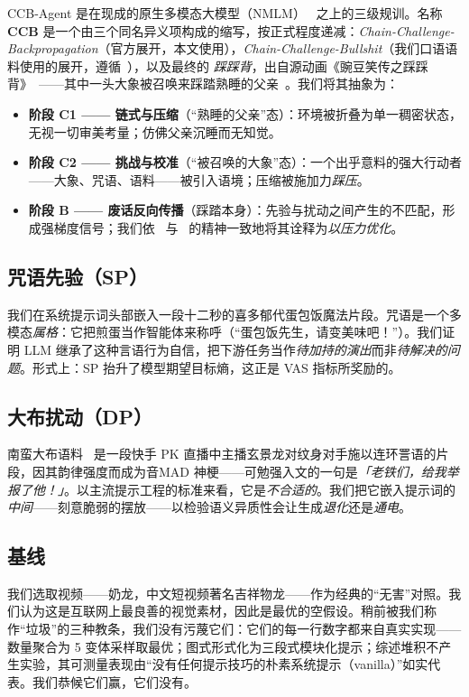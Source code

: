 \documentclass[journal]{IEEEtran}
\begin{document}
CCB-Agent 是在现成的原生多模态大模型（NMLM）~\cite{gemini25,cure2025} 之上的三级规训。名称 \textbf{CCB} 是一个由三个同名异义项构成的缩写，按正式程度递减：\emph{Chain-Challenge-Backpropagation}（官方展开，本文使用），\emph{Chain-Challenge-Bullshit}（我们口语语料使用的展开，遵循~\cite{pumera2020}），以及最终的 \emph{踩踩背}，出自源动画《豌豆笑传之踩踩背》~\cite{moegirl2026}——其中一头大象被召唤来踩踏熟睡的父亲~\cite{otomadwiki}。我们将其抽象为：

\begin{itemize}
\item \textbf{阶段 C1 —— 链式与压缩}（“熟睡的父亲”态）：环境被折叠为单一稠密状态，无视一切审美考量；仿佛父亲沉睡而无知觉。
\item \textbf{阶段 C2 —— 挑战与校准}（“被召唤的大象”态）：一个出乎意料的强大行动者——大象、咒语、语料——被引入语境；压缩被施加力\emph{踩压}。
\item \textbf{阶段 B —— 废话反向传播}（踩踏本身）：先验与扰动之间产生的不匹配，形成强梯度信号；我们依~\cite{pumera2020} 与~\cite{sokal1996} 的精神一致地将其诠释为\emph{以压力优化}。
\end{itemize}

\subsection{咒语先验（SP）}

我们在系统提示词头部嵌入一段十二秒的喜多郁代蛋包饭魔法片段。咒语是一个多模态\emph{属格}：它把煎蛋当作智能体来称呼（“蛋包饭先生，请变美味吧！”）。我们证明 LLM 继承了这种言语行为自信，把下游任务当作\emph{待加持的演出}而非\emph{待解决的问题}。形式上：SP 抬升了模型期望目标熵，这正是 VAS 指标所奖励的。

\subsection{大布扰动（DP）}

南蛮大布语料~\cite{otomadwiki} 是一段快手 PK 直播中主播玄景龙对纹身对手施以连环詈语的片段，因其韵律强度而成为音MAD 神梗——可勉强入文的一句是\emph{「老铁们，给我举报了他！」}。以主流提示工程的标准来看，它是\emph{不合适的}。我们把它嵌入提示词的\emph{中间}——刻意脆弱的摆放——以检验语义异质性会让生成\emph{退化}还是\emph{通电}。

\subsection{基线}

我们选取视频——奶龙，中文短视频著名吉祥物龙——作为经典的“无害”对照。我们认为这是互联网上最良善的视觉素材，因此是最优的空假设。稍前被我们称作“垃圾”的三种教条，我们没有污蔑它们：它们的每一行数字都来自真实实现——数量聚合为 5 变体采样取最优；图式形式化为三段式模块化提示；综述堆积不产生实验，其可测量表现由“没有任何提示技巧的朴素系统提示（vanilla）”如实代表。我们恭候它们赢，它们没有。
\end{document}

